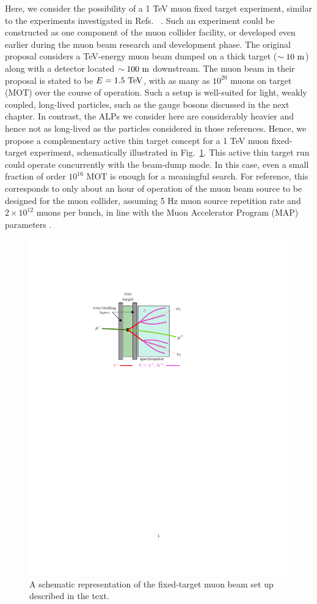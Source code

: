Here, we consider the possibility of a 1 TeV muon fixed target experiment, similar to the experiments investigated in Refs.~ \cite{Cesarotti:2022ttv,Cesarotti:2023sje}. Such an experiment could be constructed as one component of the muon collider facility, or developed even earlier during the muon beam research and development phase. The original proposal considers a TeV-energy muon beam dumped on a thick target ($\sim 10~{\rm m}$) along with a detector located $\sim100~{\rm m}$ downstream. The muon beam in their proposal is stated to be $E = 1.5~{\rm TeV}$, with as many as $10^{20}$ muons on target (MOT) over the course of operation. Such a setup is well-suited for light, weakly coupled, long-lived particles, such as the gauge bosons discussed in the next chapter. In contrast, the ALPs we consider here are considerably heavier and hence not as long-lived as the particles considered in those references. Hence, we propose a complementary active thin target concept for a 1 TeV muon fixed-target experiment, schematically illustrated in Fig.~\ref{fig:spectrometer}. This active thin target run could operate concurrently with the beam-dump mode. In this case, even a small fraction of order $10^{16}$ MOT is enough for a meaningful search. For reference, this corresponds to only about an hour of operation of the muon beam source to be designed for the muon collider, assuming 5 Hz muon source repetition rate and $2\times 10^{12}$ muons per bunch, in line with the Muon Accelerator Program (MAP) parameters \cite{Delahaye:2013jla}.

\begin{figure}[t!]
    \centering
    \includegraphics[width=0.5\linewidth]{figures/chapter5/spectrometer.pdf}
    \caption{A schematic representation of the fixed-target muon beam set up described in the text.}
    \label{fig:spectrometer}
\end{figure}

